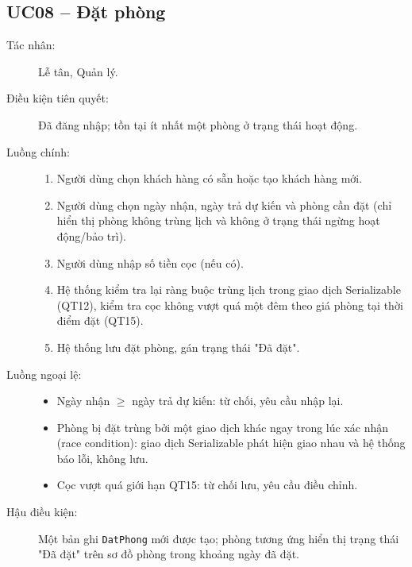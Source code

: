 \documentclass[14pt]{report}
\begin{document}
\subsection{UC08 -- Đặt phòng}
\begin{description}
  \item[Tác nhân:] Lễ tân, Quản lý.
  \item[Điều kiện tiên quyết:] Đã đăng nhập; tồn tại ít nhất một phòng ở trạng thái hoạt động.
  \item[Luồng chính:]
  \begin{enumerate}
    \item Người dùng chọn khách hàng có sẵn hoặc tạo khách hàng mới.
    \item Người dùng chọn ngày nhận, ngày trả dự kiến và phòng cần đặt (chỉ hiển thị phòng không trùng lịch và không ở trạng thái ngừng hoạt động/bảo trì).
    \item Người dùng nhập số tiền cọc (nếu có).
    \item Hệ thống kiểm tra lại ràng buộc trùng lịch trong giao dịch Serializable (QT12), kiểm tra cọc không vượt quá một đêm theo giá phòng tại thời điểm đặt (QT15).
    \item Hệ thống lưu đặt phòng, gán trạng thái "Đã đặt".
  \end{enumerate}
  \item[Luồng ngoại lệ:]
  \begin{itemize}
    \item Ngày nhận $\ge$ ngày trả dự kiến: từ chối, yêu cầu nhập lại.
    \item Phòng bị đặt trùng bởi một giao dịch khác ngay trong lúc xác nhận (race condition): giao dịch Serializable phát hiện giao nhau và hệ thống báo lỗi, không lưu.
    \item Cọc vượt quá giới hạn QT15: từ chối lưu, yêu cầu điều chỉnh.
  \end{itemize}
  \item[Hậu điều kiện:] Một bản ghi \texttt{DatPhong} mới được tạo; phòng tương ứng hiển thị trạng thái "Đã đặt" trên sơ đồ phòng trong khoảng ngày đã đặt.
\end{description}
\end{document}
